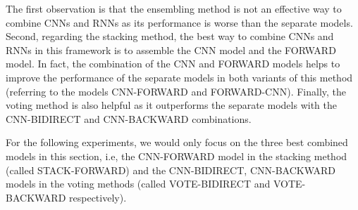 \documentclass[11pt,letterpaper]{article}
\begin{document}
The first observation is that the ensembling method is not an effective way to combine CNNs and RNNs as its performance is worse than the separate models. Second, regarding the stacking method, the best way to combine CNNs and RNNs in this framework is to assemble the CNN model and the FORWARD model. In fact, the combination of the CNN and FORWARD models helps to improve the performance of the separate models in both variants of this method (referring to the models CNN-FORWARD and FORWARD-CNN). Finally, the voting method is also helpful as it outperforms the separate models with the CNN-BIDIRECT and CNN-BACKWARD combinations. 

For the following experiments, we would only focus on the three best combined models in this section, i.e, the CNN-FORWARD model in the stacking method (called STACK-FORWARD) and the CNN-BIDIRECT, CNN-BACKWARD models in the voting methods (called VOTE-BIDIRECT and VOTE-BACKWARD respectively).



\begin{comment}
\begin{table*}[htbp]
\small
\addtolength{\belowcaptionskip}{-0.5mm}
\centering
\begin{tabular}{p{5cm}p{8.5cm}p{0.5cm}}
\hline
 \multicolumn{1}{l}{Classifier} & \multicolumn{1}{l}{Feature Sets} & \multicolumn{1}{c}{F} \\ \hline \hline
SVM & POS, WordNet, prefixes and other morphological features, dependency parse, Levin classes, PropBank, FrameNet, NomLex-Plus, Google -grams, paraphrases, TextRunner & 82.2 \\ \hline
RNN \cite{Socher:12} & word embeddings, syntactic parse, POS, NER, WordNet & 77.6 \\ 
MVRNN \cite{Socher:12} & word embeddings, syntactic parse, POS, NER, WordNet & 82.4 \\ \hline
CNN \cite{Zeng:14} & word embeddings, WordNet & 82.7 \\ \hline
CR-CNN \cite{Santos:15} & word embeddings & {\bf 84.1\dag} \\ \hline
FCM \cite{Gormley:15} & word embeddings, dependency parse, NER & 83.0 \\
Hybrid FCM \cite{Gormley:15} & word embeddings, dependency parse, NER & 83.4 \\ \hline
SDP-LSTM \cite{Xu:15} & word embeddings, POS, WordNet, dependency relation & 83.7 \\ \hline
VOTE-BIDIRECT & word embeddings, POS, NER, WordNet & {\bf 84.1} \\
STACK-FORWARD & word embeddings, POS, NER, WordNet & 83.4 \\
VOTE-BACKWARD & word embeddings, POS, NER, WordNet & {\bf 84.1} \\
\end{tabular}
\caption{Performance of Relation Classification Systems. The \dag refers to special treatment to the  class.}
\label{tab:rc}
\end{table*}
\end{comment}
\end{document}
